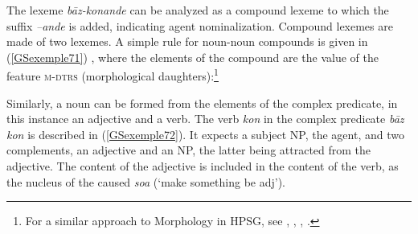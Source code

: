 \documentclass[output=paper
                ,modfonts
                ,nonflat
	        ,collection
	        ,collectionchapter
	        ,collectiontoclongg
 	        ,biblatex
                ,babelshorthands
                ,newtxmath
                ,draftmode
                ,colorlinks, citecolor=brown
]{./langsci/langscibook}
\begin{document}
{\begin{exe}
\end{exe}

The lexeme \emph{b\=az-konande} can be analyzed as a compound lexeme to which the suffix \emph{–ande} is added, indicating agent nominalization. Compound lexemes are made of two lexemes. A simple rule for noun-noun compounds is given in (\ref{GSexemple71}) \citep{bonami2018lexeme}, where the elements of the compound are the value of the feature \textsc{m-dtrs} (morphological daughters):\footnote{For a similar approach to Morphology in HPSG, see \cite{Orgun96a}, \cite{Riehemann98a}, \cite{Koenig99a}, \cite{sag2003syntactic}.}

\begin{exe}
\end{exe}

Similarly, a noun can be formed from the elements of the complex predicate, in this instance an adjective and a verb. The verb \emph{kon} in the complex predicate \emph{b\=az kon} is described in (\ref{GSexemple72}). It expects a subject NP, the agent, and two complements, an adjective and an NP, the latter being attracted from the adjective. The content of the adjective is included in the content of the verb, as the nucleus of the caused \emph{soa} (`make something be adj').

}
\end{document}
